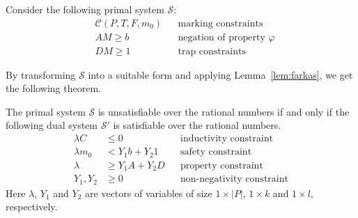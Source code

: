 Consider the following primal system $\mathcal{S}$:
\begin{align*}
  & \mathcal{C}(P, T, F, m_0)  && \text{marking constraints} \\
  & A M \ge b                 && \text{negation of property $\varphi$} \\
  & D M \ge 1                 && \text{trap constraints}
\end{align*}
%

By transforming $\mathcal{S}$ into a suitable form and applying 
Lemma~\ref{lem:farkas}, we get the following theorem.

\begin{theorem}
\label{thm:dual}
The primal system $\mathcal{S}$ is unsatisfiable over the rational numbers if
and only if the following dual system $\mathcal{S}'$ is satisfiable over the
rational numbers.
\begin{align*}
  \lambda C    & \le 0            && \text{inductivity constraint} \\
  \lambda m_0  & <   Y_1 b + Y_2 1 && \text{safety constraint} \\
  \lambda      & \ge Y_1 A + Y_2 D && \text{property constraint} \\
  Y_1, Y_2     & \ge 0     && \text{non-negativity constraint} 
\end{align*}
Here $\lambda$, $Y_1$ and $Y_2$ are vectors of variables of size $1\times |P|$,
$1\times k$ and $1\times l$, respectively.
\end{theorem}

